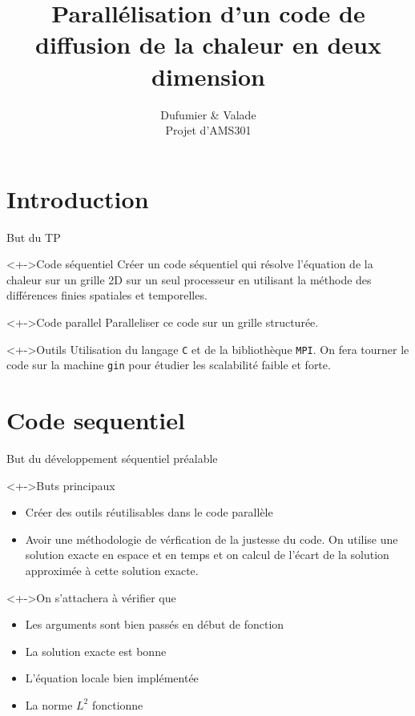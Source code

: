 \documentclass[17pt]{beamer}
\title[Parallélisation]{Parallélisation d'un code de diffusion de la chaleur en deux dimension}
\author[Dufumier \& Valade]{Dufumier \& Valade \\ Projet d'AMS301}
\date{}
\newenvironment{blockitemize}[1]{
  \begin{block}<+->{#1}
    \begin{itemize}
    }{
    \end{itemize}
  \end{block}
}
\begin{document}
\begin{frame}
  \maketitle
\end{frame}

\section{Introduction}

\begin{frame}{But du TP}
  \begin{block}<+->{Code séquentiel}
    Créer un code séquentiel qui résolve l'équation de la chaleur sur un grille 2D sur un seul processeur
    en utilisant la méthode des différences finies spatiales et temporelles.
  \end{block}
  \begin{block}<+->{Code parallel}
    Paralleliser ce code sur un grille structurée.
  \end{block}
  \begin{block}<+->{Outils}
    Utilisation du langage \texttt{C} et de la bibliothèque \texttt{MPI}. On fera tourner le code sur la
    machine \texttt{gin} pour étudier les scalabilité faible et forte.
  \end{block}
\end{frame}

\section{Code sequentiel}
\begin{frame}{But du développement séquentiel préalable}
  \begin{blockitemize}{Buts principaux}
  \item Créer des outils réutilisables dans le code parallèle
  \item Avoir une méthodologie de vérfication de la justesse du code. On utilise une solution exacte
    en espace et en temps et on calcul de l'écart de la solution approximée à cette solution exacte.
  \end{blockitemize}
  
  \begin{blockitemize}{On s'attachera à vérifier que }
  \item Les arguments sont bien passés en début de fonction
  \item La solution exacte est bonne
  \item L'équation locale bien implémentée
  \item La norme $L^2$ fonctionne
  \end{blockitemize}
\end{frame}
\end{document}
